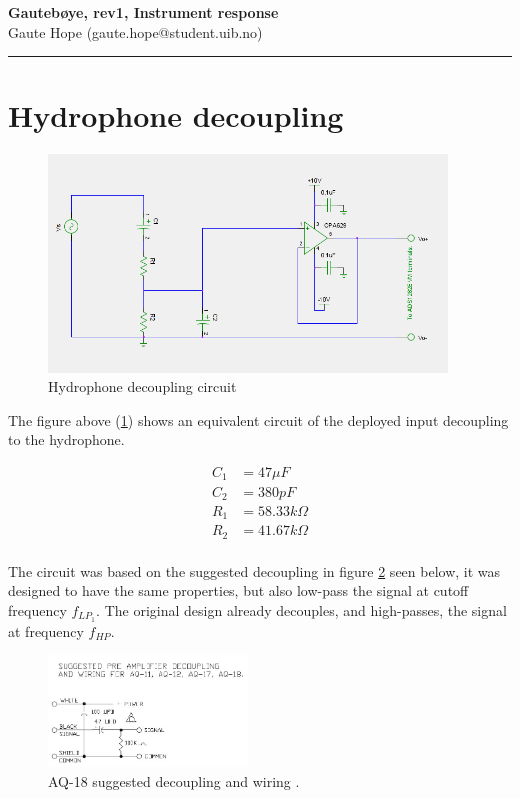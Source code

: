 \documentclass[a4paper]{article}
\newcommand{\makeheading}[2]%
        {\hspace*{-\marginparsep minus \marginparwidth}%
         \begin{minipage}[t]{\textwidth\marginparwidth\marginparsep}%
           {\large \bfseries #1}\\{#2}\\[-0.15\baselineskip]%
                 \rule{\columnwidth}{1pt}%
         \end{minipage}}
\begin{document}
\makeheading{Gautebøye, rev1, Instrument response}{Gaute Hope
(gaute.hope@student.uib.no)}

\section{Hydrophone decoupling}
\begin{figure}[h]
  \begin{center}
  \includegraphics[width=400px]{Hydrophone_decoupling.png}
\end{center}
  \caption{Hydrophone decoupling circuit}
  \label{fig:hydrophone_decoupling}
\end{figure}

The figure above (\ref{fig:hydrophone_decoupling}) shows an equivalent
circuit of the deployed input decoupling to the hydrophone.

\begin{align*}
  C_1 &= 47 \mu F \\
  C_2 &= 380 pF \\
  R_1 &= 58.33 k \Omega \\
  R_2 &= 41.67 k \Omega
\end{align*}

\paragraph{}The circuit was based on the suggested decoupling in figure
\ref{fig:suggested_decoupling} seen below, it was designed to have the
same properties, but also low-pass the signal at cutoff frequency
$f_{LP_1}$. The original design already decouples, and high-passes, the
signal at frequency $f_{HP}$.

\begin{figure}[h!]
  \begin{center}
    \includegraphics[width=200px]{AQ-18-decoupling-and-wiring.jpg}
  \end{center}
  \caption{AQ-18 suggested decoupling and wiring
    \cite{aq-18_decoupling}.}
  \label{fig:suggested_decoupling}
\end{figure}
\end{document}
